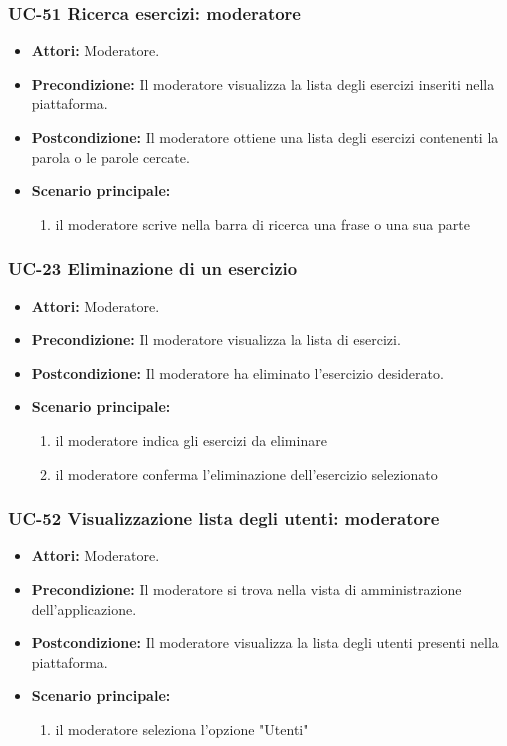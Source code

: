 \subsubsection{UC-51 Ricerca esercizi: moderatore}
	\begin{itemize}
		\item \textbf{Attori:} Moderatore.
		\item \textbf{Precondizione:} Il moderatore visualizza la lista degli esercizi inseriti nella piattaforma.
		\item \textbf{Postcondizione:} Il moderatore ottiene una lista degli esercizi contenenti la parola o le parole cercate.
		\item \textbf{Scenario principale:}
			\begin{enumerate}
				\item il moderatore scrive nella barra di ricerca una frase o una sua parte
			\end{enumerate}
	\end{itemize}
	
\subsubsection{UC-23 Eliminazione di un esercizio}
			\begin{itemize}
			\item \textbf{Attori:} Moderatore.
			\item \textbf{Precondizione:} Il moderatore visualizza la lista di esercizi.
			\item \textbf{Postcondizione:} Il moderatore ha eliminato l'esercizio desiderato.
			\item \textbf{Scenario principale:}
				\begin{enumerate}
					\item il moderatore indica gli esercizi da eliminare
					\item il moderatore conferma l'eliminazione dell'esercizio selezionato
				\end{enumerate}
		\end{itemize}

\subsubsection{UC-52 Visualizzazione lista degli utenti: moderatore}
	\begin{itemize}
		\item \textbf{Attori:} Moderatore.
		\item \textbf{Precondizione:} Il moderatore si trova nella vista di amministrazione dell'applicazione.
		\item \textbf{Postcondizione:} Il moderatore visualizza la lista degli utenti presenti nella piattaforma.
		\item \textbf{Scenario principale:}
			\begin{enumerate}
				\item il moderatore seleziona l'opzione "Utenti"
			\end{enumerate}
	\end{itemize}
		
